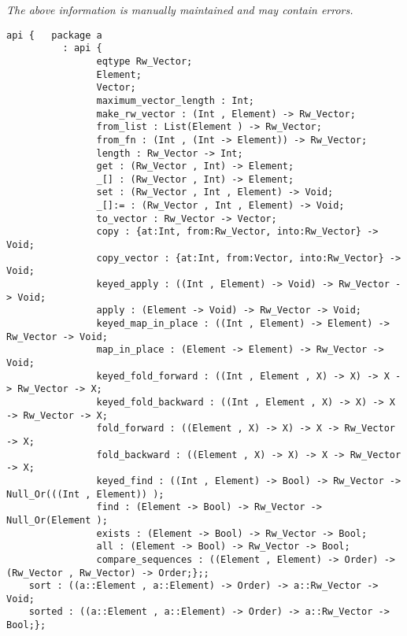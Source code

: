 \label{api:Typelocked\_Rw\_Vector\_Sort}

{\tiny \it The above information is manually maintained and may contain errors.}
\begin{verbatim}
api {   package a
          : api {
                eqtype Rw_Vector;
                Element;
                Vector;
                maximum_vector_length : Int;
                make_rw_vector : (Int , Element) -> Rw_Vector;
                from_list : List(Element ) -> Rw_Vector;
                from_fn : (Int , (Int -> Element)) -> Rw_Vector;
                length : Rw_Vector -> Int;
                get : (Rw_Vector , Int) -> Element;
                _[] : (Rw_Vector , Int) -> Element;
                set : (Rw_Vector , Int , Element) -> Void;
                _[]:= : (Rw_Vector , Int , Element) -> Void;
                to_vector : Rw_Vector -> Vector;
                copy : {at:Int, from:Rw_Vector, into:Rw_Vector} -> Void;
                copy_vector : {at:Int, from:Vector, into:Rw_Vector} -> Void;
                keyed_apply : ((Int , Element) -> Void) -> Rw_Vector -> Void;
                apply : (Element -> Void) -> Rw_Vector -> Void;
                keyed_map_in_place : ((Int , Element) -> Element) -> Rw_Vector -> Void;
                map_in_place : (Element -> Element) -> Rw_Vector -> Void;
                keyed_fold_forward : ((Int , Element , X) -> X) -> X -> Rw_Vector -> X;
                keyed_fold_backward : ((Int , Element , X) -> X) -> X -> Rw_Vector -> X;
                fold_forward : ((Element , X) -> X) -> X -> Rw_Vector -> X;
                fold_backward : ((Element , X) -> X) -> X -> Rw_Vector -> X;
                keyed_find : ((Int , Element) -> Bool) -> Rw_Vector -> Null_Or(((Int , Element)) );
                find : (Element -> Bool) -> Rw_Vector -> Null_Or(Element );
                exists : (Element -> Bool) -> Rw_Vector -> Bool;
                all : (Element -> Bool) -> Rw_Vector -> Bool;
                compare_sequences : ((Element , Element) -> Order) -> (Rw_Vector , Rw_Vector) -> Order;};;
    sort : ((a::Element , a::Element) -> Order) -> a::Rw_Vector -> Void;
    sorted : ((a::Element , a::Element) -> Order) -> a::Rw_Vector -> Bool;};
\end{verbatim}
\index[fun]{\_[]:=}
\index[fun]{\_[]}
